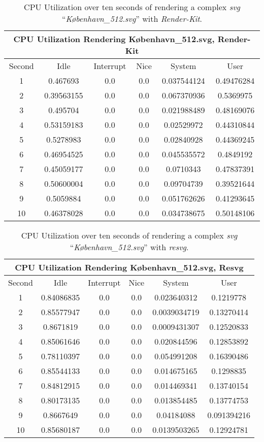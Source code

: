 \begin{table}[H]
\centering
\begin{tabular}{ |c|c|c|c|c|c| }
\hline
\multicolumn{6}{|c|}{CPU Utilization Rendering København\_512.svg, Render-Kit}\\
\hline
Second&Idle&Interrupt&Nice&System&User\\
\hline
1&0.467693&0.0&0.0&0.037544124&0.49476284\\
\hline
2&0.39563155&0.0&0.0&0.067370936&0.5369975\\
\hline
3&0.495704&0.0&0.0&0.021988489&0.48169076\\
\hline
4&0.53159183&0.0&0.0&0.02529972&0.44310844\\
\hline
5&0.5278983&0.0&0.0&0.02840928&0.44369245\\
\hline
6&0.46954525&0.0&0.0&0.045535572&0.4849192\\
\hline
7&0.45059177&0.0&0.0&0.0710343&0.47837391\\
\hline
8&0.50600004&0.0&0.0&0.09704739&0.39521644\\
\hline
9&0.5059884&0.0&0.0&0.051762626&0.41293645\\
\hline
10&0.46378028&0.0&0.0&0.034738675&0.50148106\\
\hline
\end{tabular}
\caption{CPU Utilization over ten seconds of rendering a complex \textit{svg} ``\textit{København\_512.svg}'' with \textit{Render-Kit}.\label{tab:wet_map_renderkit}}
\end{table}
\medskip

\begin{table}[H]
\centering
\begin{tabular}{ |c|c|c|c|c|c| }
\hline
\multicolumn{6}{|c|}{CPU Utilization Rendering København\_512.svg, Resvg}\\
\hline
Second&Idle&Interrupt&Nice&System&User\\
\hline
1&0.84086835&0.0&0.0&0.023640312&0.1219778\\
\hline
2&0.85577947&0.0&0.0&0.0039034719&0.13270414\\
\hline
3&0.8671819&0.0&0.0&0.0009431307&0.12520833\\
\hline
4&0.85061646&0.0&0.0&0.020844596&0.12853892\\
\hline
5&0.78110397&0.0&0.0&0.054991208&0.16390486\\
\hline
6&0.85544133&0.0&0.0&0.014675165&0.1298835\\
\hline
7&0.84812915&0.0&0.0&0.014469341&0.13740154\\
\hline
8&0.80173135&0.0&0.0&0.013854485&0.13774753\\
\hline
9&0.8667649&0.0&0.0&0.04184088&0.091394216\\
\hline
10&0.85680187&0.0&0.0&0.0139503265&0.12924781\\
\hline
\end{tabular}
\caption{CPU Utilization over ten seconds of rendering a complex \textit{svg} ``\textit{København\_512.svg}'' with \textit{resvg}.\label{tab:wet_map_resvg}}
\end{table}

